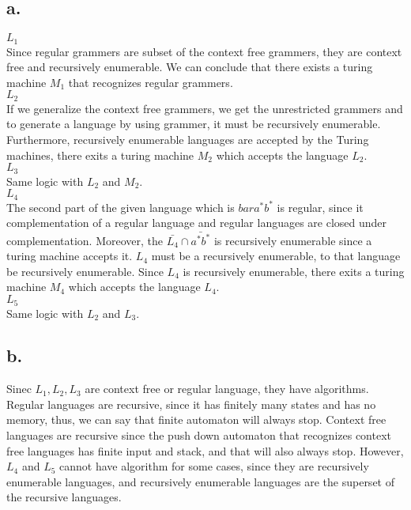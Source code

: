 \documentclass[12pt]{article}
\begin{document}
\subsection*{a.}
\textbf{$L_1$}\\
Since regular grammers are subset of the context free grammers, they are context free and recursively enumerable. We can conclude that there exists a turing machine $M_1$ that recognizes regular grammers.\\
\textbf{$L_2$}\\
If we generalize the context free grammers, we get the unrestricted grammers and to generate a language by using grammer, it must be recursively enumerable. Furthermore, recursively enumerable languages are accepted by the Turing machines, there exits a turing machine $M_2$ which accepts the language $L_2$.\\
\textbf{$L_3$}\\
Same logic with $L_2$ and $M_2$.\\
\textbf{$L_4$}\\
The second part of the given language which is $bar{a^*b^*}$ is regular, since it complementation of a regular language and regular languages are closed under complementation. Moreover, the $\bar{L_4}\cap\bar{a^*b^*}$ is recursively enumerable since a turing machine accepts it. $L_4$ must be a recursively enumerable, to that language be recursively enumerable. Since $L_4$ is recursively enumerable, there exits a turing machine $M_4$ which accepts the language $L_4$.\\
\textbf{$L_5$}\\
Same logic with $L_2$ and $L_3$.\\
\subsection*{b.}
Sinec $L_1,L_2,L_3$ are context free or regular language, they have algorithms. Regular languages are recursive, since it has finitely many states and has no memory, thus, we can say that finite automaton will always stop. Context free languages are recursive since the push down automaton that recognizes context free languages has finite input and stack, and that will also always stop.
However, $L_4$ and $L_5$ cannot have algorithm for some cases, since they are recursively enumerable languages, and recursively enumerable languages are the superset of the recursive languages.\\
\end{document}
